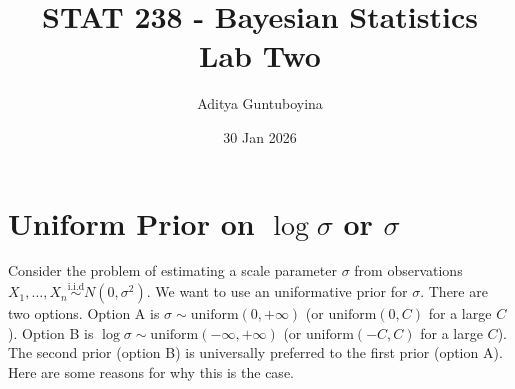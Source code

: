 \documentclass{scrartcl}
\begin{document}
\title{STAT 238 - Bayesian Statistics  \\
  Lab Two} 

\author{Aditya Guntuboyina}


\date{30 Jan 2026}

\maketitle

\section{Uniform Prior on $\log \sigma$ or $\sigma$}

Consider the problem of estimating a scale parameter $\sigma$ from
observations $X_1, \dots, X_n \overset{\text{i.i.d}}{\sim} N(0,
\sigma^2)$. We want to use an uniformative prior for $\sigma$. There
are two options. Option A is $\sigma \sim \text{uniform}(0, +\infty)$
(or $\text{uniform}(0, C)$ for a large $C$). Option B is $\log \sigma
\sim \text{uniform}(-\infty, +\infty)$ (or $\text{uniform}(-C, C)$ for
a large $C$). The second prior (option B) is universally preferred to
the first prior (option A). Here are some reasons for why this is the
case.
\end{document}
